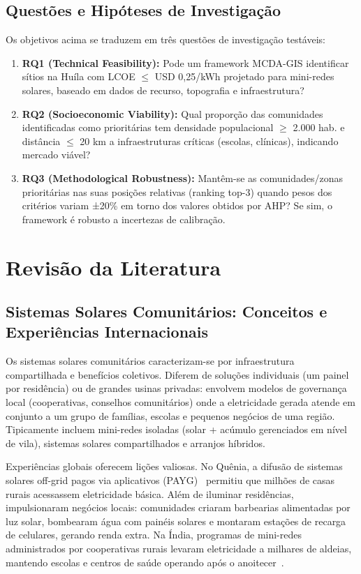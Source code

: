 \documentclass[12pt, a4paper]{article}
\begin{document}
\subsection{Questões e Hipóteses de Investigação}

Os objetivos acima se traduzem em três questões de investigação testáveis:

\begin{enumerate}
\item \textbf{RQ1 (Technical Feasibility):} Pode um framework MCDA-GIS identificar sítios na Huíla com LCOE $\leq$ USD 0,25/kWh projetado para mini-redes solares, baseado em dados de recurso, topografia e infraestrutura?

\item \textbf{RQ2 (Socioeconomic Viability):} Qual proporção das comunidades identificadas como prioritárias tem densidade populacional $\geq$ 2.000 hab. e distância $\leq$ 20 km a infraestruturas críticas (escolas, clínicas), indicando mercado viável?

\item \textbf{RQ3 (Methodological Robustness):} Mantêm-se as comunidades/zonas prioritárias nas suas posições relativas (ranking top-3) quando pesos dos critérios variam ±20\% em torno dos valores obtidos por AHP? Se sim, o framework é robusto a incertezas de calibração.
\end{enumerate}

\section{Revisão da Literatura}

\subsection{Sistemas Solares Comunitários: Conceitos e Experiências Internacionais}

Os sistemas solares comunitários caracterizam-se por infraestrutura compartilhada e benefícios coletivos. Diferem de soluções individuais (um painel por residência) ou de grandes usinas privadas: envolvem modelos de governança local (cooperativas, conselhos comunitários) onde a eletricidade gerada atende em conjunto a um grupo de famílias, escolas e pequenos negócios de uma região. Tipicamente incluem mini-redes isoladas (solar + acúmulo gerenciados em nível de vila), sistemas solares compartilhados e arranjos híbridos.

Experiências globais oferecem lições valiosas. No Quênia, a difusão de sistemas solares off-grid pagos via aplicativos (PAYG)~\citep{Onyango2022} permitiu que milhões de casas rurais acessassem eletricidade básica. Além de iluminar residências, impulsionaram negócios locais: comunidades criaram barbearias alimentadas por luz solar, bombearam água com painéis solares e montaram estações de recarga de celulares, gerando renda extra. Na Índia, programas de mini-redes administrados por cooperativas rurais levaram eletricidade a milhares de aldeias, mantendo escolas e centros de saúde operando após o anoitecer~\citep{Mapako2021}.
\end{document}
